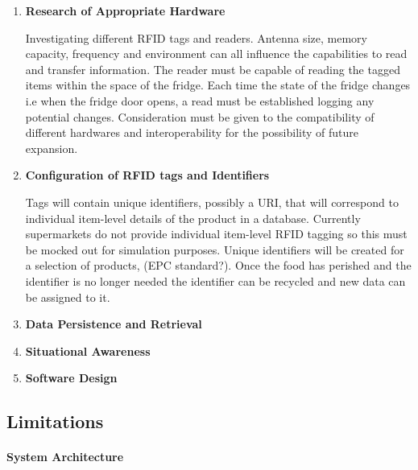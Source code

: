 \documentclass[a4paper, 11pt]{article}
\begin{document}
\begin{enumerate}
   \item \textbf{Research of Appropriate Hardware}
   	\begin{flushleft}Investigating different RFID tags and readers. Antenna size, memory capacity, frequency and environment can all influence the capabilities to read and transfer information. The reader must be capable of reading the tagged items within the space of the fridge. Each time the state of the fridge changes i.e when the fridge door opens, a read must be established logging any potential changes. Consideration must be given to the compatibility of different hardwares and interoperability for the possibility of future expansion.
	\end{flushleft}
   \item \textbf{Configuration of RFID tags and Identifiers}
   \begin{flushleft}
   Tags will contain unique identifiers, possibly a URI, that will correspond to individual item-level details of the product in a database. Currently supermarkets do not provide individual item-level RFID tagging so this must be mocked out for simulation purposes. Unique identifiers will be created for a selection of products, (EPC standard?). Once the food has perished and the identifier is no longer needed the identifier can be recycled and new data can be assigned to it.
  \end{flushleft}
   \item \textbf{Data Persistence and Retrieval}
   \begin{flushleft}
  \end{flushleft}
   \item \textbf{Situational Awareness}
   \begin{flushleft}
  \end{flushleft}
   \item \textbf{Software Design}
   \begin{flushleft} 
 \end{flushleft}
\end{enumerate}

\subsection{Limitations}
\clearpage




\paragraph{System Architecture}
\end{document}
